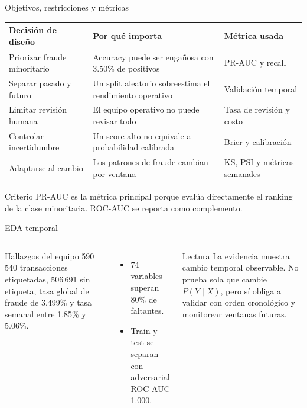 \documentclass[aspectratio=169,10pt]{beamer}
\begin{document}
\begin{frame}{Objetivos, restricciones y métricas}\small
\begin{tabularx}{\linewidth}{@{}p{.24\linewidth}XX@{}}\toprule
Decisión de diseño & Por qué importa & Métrica usada\\\midrule
Priorizar fraude minoritario & Accuracy puede ser engañosa con 3.50\% de positivos & PR-AUC y recall\\
Separar pasado y futuro & Un split aleatorio sobreestima el rendimiento operativo & Validación temporal\\
Limitar revisión humana & El equipo operativo no puede revisar todo & Tasa de revisión y costo\\
Controlar incertidumbre & Un score alto no equivale a probabilidad calibrada & Brier y calibración\\
Adaptarse al cambio & Los patrones de fraude cambian por ventana & KS, PSI y métricas semanales\\\bottomrule
\end{tabularx}
\vfill
\begin{block}{Criterio}
PR-AUC es la métrica principal porque evalúa directamente el ranking de la clase minoritaria. ROC-AUC se reporta como complemento.
\end{block}
\end{frame}

\begin{frame}{EDA temporal}\small
\begin{columns}[T]
\begin{block}{Hallazgos del equipo}
590\,540 transacciones etiquetadas, 506\,691 sin etiqueta, tasa global de fraude de 3.499\% y tasa semanal entre 1.85\% y 5.06\%.
\end{block}
\begin{itemize}
\item 74 variables superan 80\% de faltantes.
\item Train y test se separan con adversarial ROC-AUC 1.000.
\end{itemize}
\begin{block}{Lectura}
La evidencia muestra cambio temporal observable. No prueba sola que cambie $P(Y\mid X)$, pero sí obliga a validar con orden cronológico y monitorear ventanas futuras.
\end{block}
\end{columns}
\end{frame}
\end{document}

